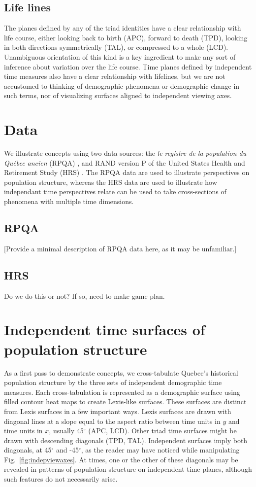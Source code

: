 \subsection{Life lines}
The planes defined by any of the triad identities have a clear relationship with life course, either looking back to birth (APC), forward to death (TPD), looking in both directions symmetrically (TAL), or compressed to a whole (LCD). Unambiguous orientation of this kind is a key ingredient to make any sort of inference about variation over the life course. Time planes defined by independent time measures also have a clear relationship with lifelines, but we are not accustomed to thinking of demographic phenomena or demographic change in such terms, nor of visualizing surfaces aligned to independent viewing axes.


\section{Data}
We illustrate concepts using two data sources: the \emph{le registre de la population du Qu\'{e}bec ancien} (RPQA) \citep{desjardins1998}, and RAND version P of the United States Health and Retirement Study (HRS) \citep{HRS, RAND}. The RPQA data are used to illustrate perspectives on population structure, whereas the HRS data are used to illustrate how independant time perspectives
relate can be used to take cross-sections of phenomena with multiple time dimensions.

\subsection{RPQA}
[Provide a minimal description of RPQA data here, as it may be unfamiliar.]

\subsection{HRS}
Do we do this or not? If so, need to make game plan.

\section{Independent time surfaces of population structure}
As a first pass to demonstrate concepts, we cross-tabulate Quebec's historical
population structure by the three sets of independent demographic time measures. Each
cross-tabulation is represented as a demographic surface using filled
contour heat maps to create Lexis-like surfaces. These surfaces are distinct
from Lexis surfaces in a few important ways. Lexis surfaces are drawn with
diagonal lines at a slope equal to the aspect ratio between time units in $y$
and time units in $x$, usually 45$^\circ$ (APC, LCD). Other triad time surfaces
might be drawn with descending diagonals (TPD, TAL). Independent surfaces
imply both diagonals, at 45$^\circ$ and -45$^\circ$, as the reader may have
noticed while manipulating Fig.~\ref{fig:indepviewaxes}. At times, one or the
other of these diagonals may be revealed in patterns of population structure on
independent time planes, although such features do not necessarily arise. 

